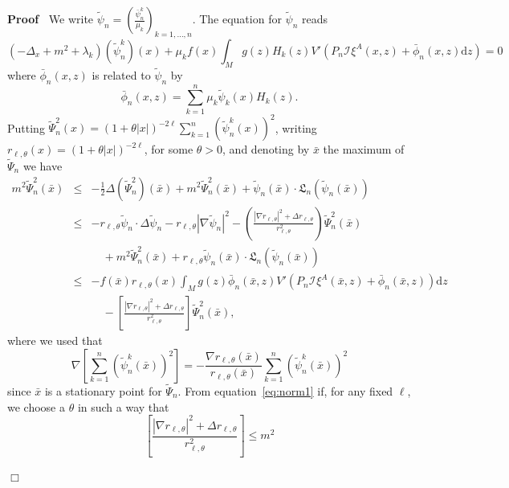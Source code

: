 \documentclass[a4paper,10pt]{article}
\newcommand{\mathd}{\mathrm{d}}
\newenvironment{proof}{\noindent\textbf{Proof\ }}{\hspace*{\fill}$\Box$\medskip}
\begin{document}
\begin{proof}
  We write $\tilde{\psi}_n = \left( \frac{\bar{\psi}_n^k}{\mu_k} \right)_{k =
  1, \ldots, n}$. The equation for $\tilde{\psi}_n$ reads
  \[ (- \Delta_x + m^2 + \lambda_k) (\tilde{\psi}^k_n) (x) + \mu_k f (x)
     \int_M g (z) H_k (z) V' (P_n \mathcal{I}_{\mathfrak{}} \xi^A (x, z) +
     \bar{\phi}_n (x, z) \mathd z) = 0 \]
  where $\bar{\phi}_n (x, z)$ is related to $\tilde{\psi}_n$ by
  \[ \bar{\phi}_n (x, z) = \sum_{k = 1}^n \mu_k \tilde{\psi}_k (x) H_k (z) .
  \]
  Putting $\tilde{\Psi}_n^2 (x) = (1 + \theta | x |)^{- 2 \ell} \sum_{k = 1}^n
  (\tilde{\psi}^k_n (x))^2$, writing $r_{\ell, \theta} (x) = (1 + \theta | x
  |)^{- 2 \ell}$, for some $\theta > 0$, and denoting by $\bar{x}$ the maximum
  of $\tilde{\Psi}_n$ we have
  \begin{eqnarray}
    m^2 \tilde{\Psi}_n^2 (\bar{x}) & \leqslant & - \frac{1}{2} \Delta
    (\tilde{\Psi}_n^2) (\bar{x}) + m^2 \tilde{\Psi}_n^2 (\bar{x}) +
    \tilde{\psi}_n (\bar{x}) \cdot \mathfrak{L}_n (\tilde{\psi}_n (\bar{x}))
    \nonumber\\
    & \leqslant & - r_{\ell, \theta} \tilde{\psi}_n \cdot \Delta
    \tilde{\psi}_n - r_{\ell, \theta} | \nabla \tilde{\psi}_n |^2 - \left(
    \frac{| \nabla r_{\ell, \theta} |^2 + \Delta r_{\ell, \theta}}{r_{\ell,
    \theta}^2} \right) \tilde{\Psi}^2_n (\bar{x}) \nonumber\\
    &  & \quad + m^2 \tilde{\Psi}_n^2 (\bar{x}) + r_{\ell, \theta}
    \tilde{\psi}_n (\bar{x}) \cdot \mathfrak{L}_n (\tilde{\psi}_n (\bar{x}))
    \nonumber\\
    & \leqslant & - f (\bar{x}) r_{\ell, \theta} (x) \int_M g (z)
    \bar{\phi}_n (\bar{x}, z) V' (P_n \mathcal{I}_{\mathfrak{}} \xi^A
    (\bar{x}, z) + \bar{\phi}_n (\bar{x}, z)) \mathd z \nonumber\\
    &  & \quad - \left[ \frac{| \nabla r_{\ell, \theta} |^2 + \Delta r_{\ell,
    \theta}}{r_{\ell, \theta}^2} \right] \tilde{\Psi}^2_n (\bar{x}), 
    \label{eq:norm1}
  \end{eqnarray}
  where we used that
  \[ \nabla \left[ \sum_{k = 1}^n (\tilde{\psi}^k_n (\bar{x}))^2 \right] = -
     \frac{\nabla r_{\ell, \theta} (\bar{x})}{r_{\ell, \theta} (\bar{x})}
     \sum_{k = 1}^n (\tilde{\psi}^k_n (\bar{x}))^2 \]
  since $\bar{x}$ is a stationary point for $\tilde{\Psi}_n$. From
  equation~{\eqref{eq:norm1}} if, for any fixed $\ell$, we choose a $\theta$
  in such a way that
  \[ \left[ \frac{| \nabla r_{\ell, \theta} |^2 + \Delta r_{\ell,
     \theta}}{r_{\ell, \theta}^2} \right] \leqslant m^2 \]

\end{proof}
\end{document}
